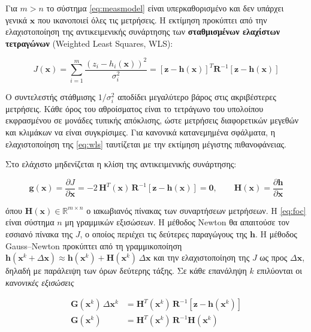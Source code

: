Για $m > n$ το σύστημα \eqref{eq:measmodel} είναι υπερκαθορισμένο και δεν υπάρχει γενικά
$\mathbf{x}$ που ικανοποιεί όλες τις μετρήσεις. Η εκτίμηση προκύπτει από την ελαχιστοποίηση της
αντικειμενικής συνάρτησης των \textbf{σταθμισμένων ελαχίστων τετραγώνων} (Weighted Least
Squares, WLS):

\begin{equation}
J(\mathbf{x}) = \sum_{i=1}^{m} \frac{\left(z_i - h_i(\mathbf{x})\right)^2}{\sigma_i^2}
             = \left[\mathbf{z}-\mathbf{h}(\mathbf{x})\right]^{T} \mathbf{R}^{-1}
               \left[\mathbf{z}-\mathbf{h}(\mathbf{x})\right]
\label{eq:wls}
\end{equation}

Ο συντελεστής στάθμισης $1/\sigma_i^2$ αποδίδει μεγαλύτερο βάρος στις ακριβέστερες μετρήσεις.
Κάθε όρος του αθροίσματος είναι το τετράγωνο του υπολοίπου εκφρασμένου σε μονάδες τυπικής
απόκλισης, ώστε μετρήσεις διαφορετικών μεγεθών και κλιμάκων να είναι συγκρίσιμες. Για
κανονικά κατανεμημένα σφάλματα, η ελαχιστοποίηση της \eqref{eq:wls} ταυτίζεται με την
εκτίμηση μέγιστης πιθανοφάνειας.

Στο ελάχιστο μηδενίζεται η κλίση της αντικειμενικής συνάρτησης:

\begin{equation}
\mathbf{g}(\mathbf{x}) = \frac{\partial J}{\partial \mathbf{x}}
  = -2\,\mathbf{H}^{T}(\mathbf{x})\,\mathbf{R}^{-1}\left[\mathbf{z} - \mathbf{h}(\mathbf{x})\right]
  = \mathbf{0}, \qquad
\mathbf{H}(\mathbf{x}) = \frac{\partial \mathbf{h}}{\partial \mathbf{x}}
\label{eq:foc}
\end{equation}

όπου $\mathbf{H}(\mathbf{x}) \in \mathbb{R}^{m \times n}$ ο ιακωβιανός πίνακας των συναρτήσεων
μετρήσεων. Η \eqref{eq:foc} είναι σύστημα $n$ μη γραμμικών εξισώσεων. Η μέθοδος Newton θα
απαιτούσε τον εσσιανό πίνακα της $J$, ο οποίος περιέχει τις δεύτερες παραγώγους της
$\mathbf{h}$. Η μέθοδος Gauss--Newton προκύπτει από τη γραμμικοποίηση
$\mathbf{h}(\mathbf{x}^{k} + \Delta\mathbf{x}) \approx \mathbf{h}(\mathbf{x}^{k}) +
\mathbf{H}(\mathbf{x}^{k})\,\Delta\mathbf{x}$ και την ελαχιστοποίηση της $J$ ως προς
$\Delta\mathbf{x}$, δηλαδή με παράλειψη των όρων δεύτερης τάξης. Σε κάθε επανάληψη $k$
επιλύονται οι \emph{κανονικές εξισώσεις}

\begin{align}
\mathbf{G}(\mathbf{x}^{k}) \, \Delta \mathbf{x}^{k}
  &= \mathbf{H}^{T}(\mathbf{x}^{k}) \, \mathbf{R}^{-1}
     \left[\mathbf{z} - \mathbf{h}(\mathbf{x}^{k})\right] \\
\mathbf{G}(\mathbf{x}^{k})
  &= \mathbf{H}^{T}(\mathbf{x}^{k}) \, \mathbf{R}^{-1} \mathbf{H}(\mathbf{x}^{k})
\label{eq:gain}
\end{align}

